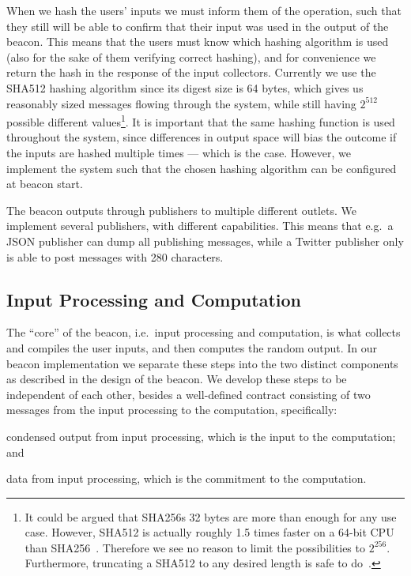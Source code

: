 When we hash the users' inputs we must inform them of the operation, such that they still will be able to confirm that their input was used in the output of the beacon.
This means that the users must know which hashing algorithm is used (also for the sake of them verifying correct hashing), and for convenience we return the hash in the response of the input collectors.
Currently we use the SHA512 hashing algorithm since its digest size is 64 bytes, which gives us reasonably sized messages flowing through the system, while still having $2^{512}$ possible different values\footnote{It could be argued that SHA256s 32 bytes are more than enough for any use case. However, SHA512 is actually roughly 1.5 times faster on a 64-bit CPU than SHA256~\cite{sha512faster}. Therefore we see no reason to limit the possibilities to $2^{256}$. Furthermore, truncating a SHA512 to any desired length is safe to do~\cite{sha512faster}.}.
It is important that the same hashing function is used throughout the system, since differences in output space will bias the outcome if the inputs are hashed multiple times --- which is the case.
However, we implement the system such that the chosen hashing algorithm can be configured at beacon start.

The beacon outputs through publishers to multiple different outlets.
We implement several publishers, with different capabilities.
This means that e.g.\ a JSON publisher can dump all publishing messages, while a Twitter publisher only is able to post messages with 280 characters.

\subsection{Input Processing and Computation}%
\label{sub:input_processing_and_computation}
The \enquote{core} of the beacon, i.e.\ input processing and computation, is what collects and compiles the user inputs, and then computes the random output.
In our beacon implementation we separate these steps into the two distinct components as described in the design of the beacon.
We develop these steps to be independent of each other, besides a well-defined contract consisting of two messages from the input processing to the computation, specifically:
\begin{eletterate*}
\item condensed output from input processing, which is the input to the computation; and
\item data from input processing, which is the commitment to the computation.
\end{eletterate*}

